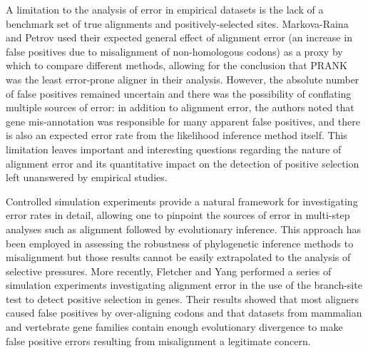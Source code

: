 \documentclass{article}
\begin{document}
A limitation to the analysis of error in empirical datasets is the
lack of a benchmark set of true alignments and positively-selected
sites. Markova-Raina and Petrov \citeyearpar{Markova-Raina2011High}
used their expected general effect of alignment error (an increase in
false positives due to misalignment of non-homologous codons) as a
proxy by which to compare different methods, allowing for the
conclusion that PRANK was the least error-prone aligner in their
analysis. However, the absolute number of false positives remained
uncertain and there was the possibility of conflating multiple sources
of error: in addition to alignment error, the authors noted that gene
mis-annotation was responsible for many apparent false positives, and
there is also an expected error rate from the likelihood inference
method itself. This limitation leaves important and interesting
questions regarding the nature of alignment error and its quantitative
impact on the detection of positive selection left unanswered by
empirical studies.

Controlled simulation experiments provide a natural framework for
investigating error rates in detail, allowing one to pinpoint the
sources of error in multi-step analyses such as alignment followed by
evolutionary inference. This approach has been employed in assessing
the robustness of phylogenetic inference methods to misalignment
\citep{Dwivedi2009Phylogenetic,Ogden2006Multiple,Loytynoja2008PhylogenyAware}
but those results cannot be easily extrapolated to the analysis of \sw
selective pressures. More recently, Fletcher and Yang
\citeyearpar{Fletcher2010Effect} performed a series of simulation
experiments investigating alignment error in the use of the
branch-site test to detect positive selection in genes. Their results
showed that most aligners caused false positives by over-aligning
codons and that datasets from mammalian and vertebrate gene families
contain enough evolutionary divergence to make false positive errors
resulting from misalignment a legitimate concern.
\end{document}
